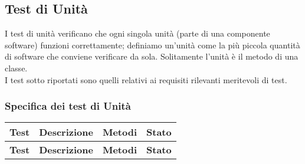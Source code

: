 \subsection{Test di Unità}
I test di unità verificano che ogni singola unità (parte di una componente software) funzioni correttamente; definiamo un’unità come la più piccola quantità di software che conviene verificare da sola. Solitamente l’unità è il metodo di una classe.\\
I test sotto riportati sono quelli relativi ai requisiti rilevanti meritevoli di test.

\subsubsection{Specifica dei test di Unità}
\begin{longtable}{p{2cm}!{\VRule[1pt]}p{5cm}!{\VRule[1pt]}p{4.5cm}!{\VRule[1pt]}p{1.5cm}}
\color{white} \textbf{Test} & \color{white} \textbf{Descrizione}  & \color{white} \textbf{Metodi}  & \color{white} \textbf{Stato}\\ 
\endfirsthead 
{} 
\color{white} \textbf{Test} & \color{white} \textbf{Descrizione}  & \color{white} \textbf{Metodi}  & \color{white} \textbf{Stato}\\  
\endhead 


\end{longtable}
